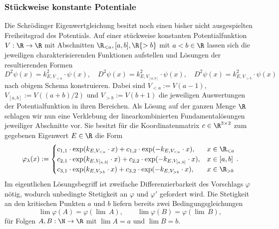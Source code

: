 \documentclass[../main.tex]{subfiles}
\begin{document}
        \subsubsection{Stückweise konstante Potentiale}
            Die Schrödinger Eigenwertgleichung besitzt noch einen bisher nicht ausgespielten Freiheitsgrad des Potentials. Auf einer stückweise konstanten Potentialfunktion $V:\R\to\R$ mit Abschnitten $\R_{<a},[a,b],\R{>b}$ mit $a<b\in\R$ lassen sich die jeweiligen charakterisierenden Funktionen aufstellen und Lösungen der resultierenden Formen 
            \[
                D^2\psi(x) = k_{E,V_{<a}}^2\cdot\psi(x),\quad D^2\psi(x) = k_{E,V_{[a,b]}}^2\cdot\psi(x),\quad D^2\psi(x) = k_{E,V_{>b}}^2\cdot\psi(x)
            \] 
            nach obigem Schema konstruieren. Dabei sind $V_{<a}:=V(a - 1)$, $V_{[a,b]}:=V((a + b) / 2)$ und $V_{>b}:=V(b + 1)$ die jeweiligen Auswertungen der Potentialfunktion in ihren Bereichen. Als Lösung auf der ganzen Menge $\R$ schlagen wir nun eine Verklebung der linearkombinierten Fundamentalösungen jeweiliger Abschnitte vor. Sie besitzt für die Koordinatenmatrix $c\in\R^{3\times 2}$ zum gegebenen Eigenwert $E\in\R$ die Form 
            \[
                \varphi_\lambda(x) := \begin{cases}
                    c_{1,1}\cdot \exp(k_{E,V_{<a}}\cdot x) + c_{1,2}\cdot \exp(-k_{E,V_{<a}}\cdot x), & x \in\R_{<a} \\
                    c_{2,1}\cdot \exp(k_{E,V_{[a,b]}}\cdot x) + c_{2,2}\cdot \exp(-k_{E,V_{[a,b]}}\cdot x), & x \in[a,b] \\
                    c_{3,1}\cdot \exp(k_{E,V_{>b}}\cdot x) + c_{3,2}\cdot \exp(-k_{E,V_{>b}}\cdot x), & x \in\R_{>b}
                \end{cases}.
            \]
            Im eigentlichen Lösungsbegriff ist zweifache Differenzierbarkeit des Vorschlags $\varphi$ nötig, wodurch unbedingte Stetigkeit an $\varphi$ und $\varphi'$ gefordert wird. Die Stetigkeit an den kritischen Punkten $a$ und $b$ liefern bereits zwei Bedingungsgleichungen 
            \[
                \lim\varphi(A) = \varphi(\lim\, A),\qquad \lim\varphi(B) = \varphi(\lim\, B),
            \]
            für Folgen $A,B:\N\to\R$ mit $\lim A = a$ und $\lim B = b$. 
            
\end{document}
